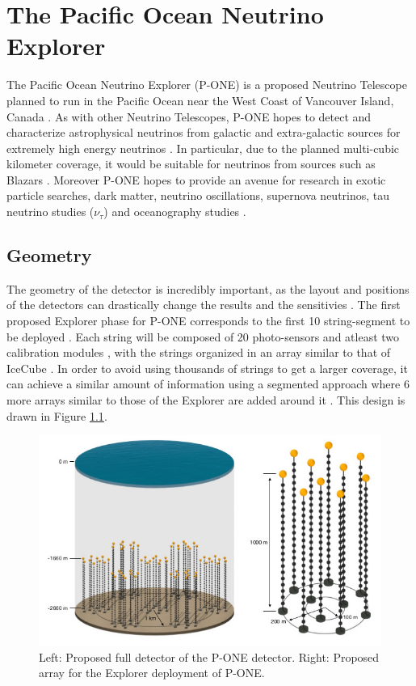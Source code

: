 \chapter{The Pacific Ocean Neutrino Explorer}

The  Pacific Ocean Neutrino Explorer (P-ONE) is a proposed Neutrino Telescope planned to run in the Pacific Ocean near the West Coast of Vancouver Island, Canada \cite{pone}. As with other Neutrino Telescopes, P-ONE hopes to detect and characterize astrophysical neutrinos from galactic and extra-galactic sources for extremely high energy neutrinos \cite{pone}. In particular, due to the planned multi-cubic kilometer coverage, it would be suitable for neutrinos from sources such as Blazars \cite{icecube_nat}. Moreover P-ONE hopes to provide an avenue for research in exotic particle searches, dark matter, neutrino oscillations, supernova neutrinos, tau neutrino studies ($\nu_{\tau}$) and oceanography studies \cite{pone}. 

\section{Geometry}

The geometry of the detector is incredibly important, as the layout and positions of the detectors can drastically change the results and the sensitivies \cite{icecube}. The first proposed Explorer phase for P-ONE corresponds to the first 10 string-segment to be deployed \cite{pone}. Each string will be composed of 20 photo-sensors and atleast two calibration modules \cite{pone}, with the strings organized in an array similar to that of IceCube \cite{pone,icecube}. In order to avoid using thousands of strings to get a larger coverage, it can achieve a similar amount of information using a segmented approach where 6 more arrays similar to those of the Explorer are added around it \cite{pone}. This design is drawn in Figure \ref{fig:pone_geo}. 

\begin{figure}[h]
  \centering
  \includegraphics[width=12cm]{./Figures/PONEv0_-23_design.jpg}
  \caption{Left: Proposed full detector of the P-ONE detector. Right: Proposed array for the Explorer deployment of P-ONE.}
  \label{fig:pone_geo}
\end{figure}

